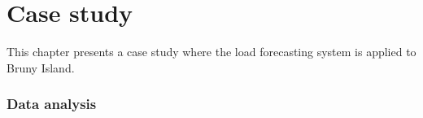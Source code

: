 \chapter{Case study}
This chapter presents a case study where the load forecasting system is applied to Bruny Island.

\subsection{Data analysis}
